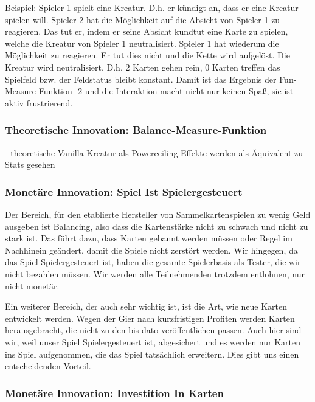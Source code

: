\documentclass[fontsize=12]{scrartcl}
\begin{document}
	\noindent Beispiel: Spieler 1 spielt eine Kreatur. D.h. er kündigt an, dass er eine Kreatur spielen will. Spieler 2 hat die Möglichkeit auf die Absicht von Spieler 1 zu reagieren. Das tut er, indem er seine Absicht kundtut eine Karte zu spielen, welche die Kreatur von Spieler 1 neutralisiert. Spieler 1 hat wiederum die Möglichkeit zu reagieren. Er tut dies nicht und die Kette wird aufgelöst. Die Kreatur wird neutralisiert. D.h. 2 Karten gehen rein, 0 Karten treffen das Spielfeld bzw. der Feldstatus bleibt konstant. Damit ist das Ergebnis der Fun-Measure-Funktion -2 und die Interaktion macht nicht nur keinen Spaß, sie ist aktiv frustrierend.\hfill\newline
	
	\subsubsection{Theoretische Innovation: Balance-Measure-Funktion}
	
	- theoretische Vanilla-Kreatur als Powerceiling Effekte werden als Äquivalent zu Stats gesehen
	
	\subsubsection{Monetäre Innovation: Spiel Ist Spielergesteuert}
	
	Der Bereich, für den etablierte Hersteller von Sammelkartenspielen zu wenig Geld ausgeben ist Balancing, also dass die Kartenstärke nicht zu schwach und nicht zu stark ist. Das führt dazu, dass Karten gebannt werden müssen oder Regel im Nachhinein geändert, damit die Spiele nicht zerstört werden. Wir hingegen, da das Spiel Spielergesteuert ist, haben die gesamte Spielerbasis als Tester, die wir nicht bezahlen müssen. Wir werden alle Teilnehmenden trotzdem entlohnen, nur nicht monetär.\hfill\newline
	
	\noindent Ein weiterer Bereich, der auch sehr wichtig ist, ist die Art, wie neue Karten entwickelt werden. Wegen der Gier nach kurzfristigen Profiten werden Karten herausgebracht, die nicht zu den bis dato veröffentlichen passen. Auch hier sind wir, weil unser Spiel Spielergesteuert ist, abgesichert und es werden nur Karten ins Spiel aufgenommen, die das Spiel tatsächlich erweitern. Dies gibt uns einen entscheidenden Vorteil.
	
	\subsubsection{Monetäre Innovation: Investition In Karten}
	
\end{document}
